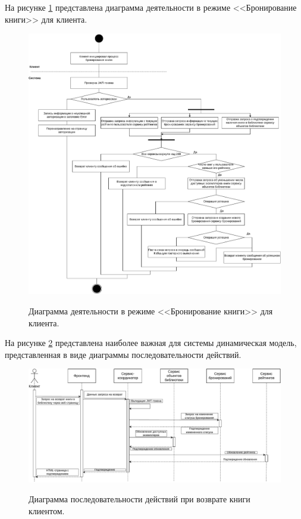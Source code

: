 \documentclass[a4paper, 12pt]{article}
\begin{document}
\begin{large}
\pagebreak

На рисунке \ref{fig:schema-reservation} представлена диаграмма деятельности в режиме <<Бронирование книги>> для клиента.

\begin{figure}[h!]
	\begin{center}
		{\includegraphics[scale = 0.5]{Activity}}
		\caption{Диаграмма деятельности в режиме <<Бронирование книги>> для клиента.}
		\label{fig:schema-reservation}
	\end{center}
\end{figure}

\pagebreak

\begin{landscape}

На рисунке \ref{fig:flow-level1} представлена наиболее важная для системы динамическая модель, представленная в виде диаграммы последовательности действий.

\begin{figure}[h!]
	\begin{center}
		{\includegraphics[scale = 0.9]{Sequence}}
		\caption{Диаграмма последовательности действий при возврате книги клиентом.}
		\label{fig:flow-level1}
	\end{center}
\end{figure}


\end{landscape}
\end{large}
\end{document}
